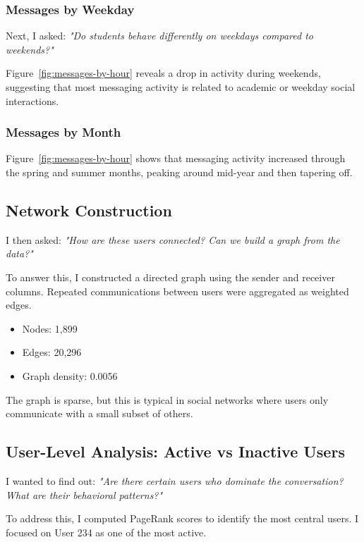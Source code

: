 \subsubsection*{Messages by Weekday}

Next, I asked: \textit{"Do students behave differently on weekdays compared to weekends?"} 

Figure~\ref{fig:messages-by-hour} reveals a drop in activity during weekends, suggesting that most messaging activity is related to academic or weekday social interactions.

\subsubsection*{Messages by Month}

Figure~\ref{fig:messages-by-hour} shows that messaging activity increased through the spring and summer months, peaking around mid-year and then tapering off.

\subsection{Network Construction}

I then asked: \textit{"How are these users connected? Can we build a graph from the data?"}

To answer this, I constructed a directed graph using the sender and receiver columns. Repeated communications between users were aggregated as weighted edges.

\begin{itemize}
    \item Nodes: 1,899
    \item Edges: 20,296
    \item Graph density: 0.0056
\end{itemize}

The graph is sparse, but this is typical in social networks where users only communicate with a small subset of others.

\subsection{User-Level Analysis: Active vs Inactive Users}

I wanted to find out: \textit{"Are there certain users who dominate the conversation? What are their behavioral patterns?"}

To address this, I computed PageRank scores to identify the most central users. I focused on User 234 as one of the most active.

